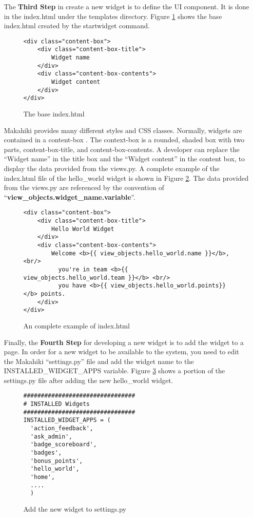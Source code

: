 The {\bf Third Step} in create a new widget is to define the UI component. It is done in the index.html under the templates directory.
Figure \ref{fig:index-base} shows the base index.html created by the startwidget command.

\begin{figure}[!ht]
\begin{lstlisting}
<div class="content-box">
    <div class="content-box-title">
        Widget name
    </div>
    <div class="content-box-contents">
        Widget content
    </div>
</div>
\end{lstlisting}
\caption{The base index.html}
\label{fig:index-base}
\end{figure}

Makahiki provides many different styles and CSS classes. Normally, widgets are contained in a content-box . The context-box is a rounded, shaded box with two parts, content-box-title, and content-box-contents. A developer can replace the ``Widget name'' in the title box and the ``Widget content'' in the content box, to display the data provided from the views.py. A complete example of the index.html file of the hello\_world widget is shown in Figure \ref{fig:index-example}. The data provided from the views.py are referenced by the convention of ``{\bf view\_objects.widget\_name.variable}''.

\begin{figure}[!ht]
\begin{lstlisting}
<div class="content-box">
    <div class="content-box-title">
        Hello World Widget
    </div>
    <div class="content-box-contents">
        Welcome <b>{{ view_objects.hello_world.name }}</b>, <br/>
          you're in team <b>{{ view_objects.hello_world.team }}</b> <br/>
          you have <b>{{ view_objects.hello_world.points}}</b> points.
    </div>
</div>
\end{lstlisting}
\caption{An complete example of index.html}
\label{fig:index-example}
\end{figure}

Finally, the {\bf Fourth Step} for developing a new widget is to add the widget to a page. In order for a new widget to be available to the system, you need to edit the Makahiki ``settings.py'' file and add the widget name to the INSTALLED\_WIDGET\_APPS variable. Figure \ref{fig:installed-widget} shows a portion of the settings.py file after adding the new hello\_world widget. 
\begin{figure}[!ht]
\begin{lstlisting}
################################
# INSTALLED Widgets
################################
INSTALLED_WIDGET_APPS = (
  'action_feedback',
  'ask_admin',
  'badge_scoreboard',
  'badges',
  'bonus_points',
  'hello_world',
  'home',
  ....
  )
\end{lstlisting}
\caption{Add the new widget to settings.py}
\label{fig:installed-widget}
\end{figure}

